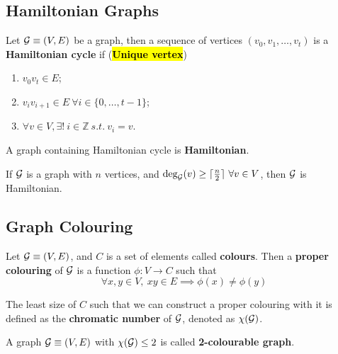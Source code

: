 \documentclass{article}
\def\Z{{\mathbb Z}}
\begin{document}
		\subsection{Hamiltonian Graphs}
			\begin{definition}
				Let $\mathcal{{G}} \equiv (V, E)$ be a graph, then a sequence of vertices $(v_0, v_1, \dots, v_t)$ is a \textbf{Hamiltonian cycle} if (\hl{\textbf{Unique vertex}})
				\begin{enumerate}
					\item $v_0 v_t \in E$;
					\item $v_i v_{i+1} \in E\ \forall i \in \{0, \dots, t-1\}$;
					\item $\forall v \in V, \exists!\ i \in \Z\ s.t.\ v_i = v$.
				\end{enumerate}
			\end{definition}
			
			\begin{definition}
				A graph containing Hamiltonian cycle is \textbf{Hamiltonian}.
			\end{definition}
			
			\begin{theorem}
				If $\mathcal{{G}}$ is a graph with $n$ vertices, and $\text{{deg}}_{\mathcal{{G}}}(v) \geq \lceil \frac{n}{2} \rceil\ \forall v \in V$, then $\mathcal{{G}}$ is Hamiltonian.
			\end{theorem}
			
		\subsection{Graph Colouring}
			\begin{definition}
				Let $\mathcal{{G}} \equiv (V, E)$, and $C$ is a set of elements called \textbf{colours}. Then a \textbf{proper colouring} of $\mathcal{{G}}$ is a function $\phi:V \to C$ such that 
				\begin{equation}
					\forall x, y \in V,\ xy \in E \implies \phi(x) \neq \phi(y)
				\end{equation}
			\end{definition}
			
			\begin{definition}
				The least size of $C$ such that we can construct a proper colouring with it is defined as the \textbf{chromatic number} of $\mathcal{{G}}$, denoted as $\chi(\mathcal{{G}})$.
			\end{definition}
			
			\begin{definition}
				A graph $\mathcal{{G}} \equiv (V, E)$ with $\chi(\mathcal{{G}}) \leq 2$ is called \textbf{2-colourable graph}.
			\end{definition}
			
\end{document}
